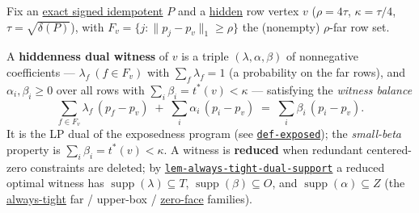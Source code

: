 \hypertarget{def:dual-witness}{}%
\begin{definition}\label{def:dual-witness}
Fix an \hyperref[def:signed-idempotent]{exact signed idempotent} $P$ and a
\hyperref[def:exposed]{hidden} row vertex $v$ ($\rho=4\tau$, $\kappa=\tau/4$, $\tau=\sqrt{\delta(P)}$), with
$F_v=\{j:\lVert p_j-p_v\rVert_1\ge\rho\}$ the (nonempty) $\rho$-far row set.

A \textbf{hiddenness dual witness} of $v$ is a triple $(\lambda,\alpha,\beta)$ of nonnegative
coefficients --- $\lambda_f\ (f\in F_v)$ with $\sum_f\lambda_f=1$ (a probability on the far rows), and
$\alpha_i,\beta_i\ge0$ over all rows with $\sum_i\beta_i=t^*(v)<\kappa$ --- satisfying the \emph{witness
balance}
\[\sum_{f\in F_v}\lambda_f\,(p_f-p_v)\;+\;\sum_i\alpha_i\,(p_i-p_v)\;=\;\sum_i\beta_i\,(p_i-p_v).\]
It is the LP dual of the exposedness program (see \hyperref[def:exposed]{\texttt{def-\allowbreak{}exposed}}); the \emph{small-beta} property is
$\sum_i\beta_i=t^*(v)<\kappa$. A witness is \textbf{reduced} when redundant centered-zero constraints are
deleted; by \hyperlink{dag:lem-always-tight-dual-support}{\texttt{lem-\allowbreak{}always-\allowbreak{}tight-\allowbreak{}dual-\allowbreak{}support}} a reduced optimal witness has
$\operatorname{supp}(\lambda)\subseteq T$, $\operatorname{supp}(\beta)\subseteq O$, and
$\operatorname{supp}(\alpha)\subseteq Z$ (the \hyperref[def:actor-hull]{always-tight} far / upper-box /
\hyperref[def:zero-face]{zero-face} families).
\end{definition}
